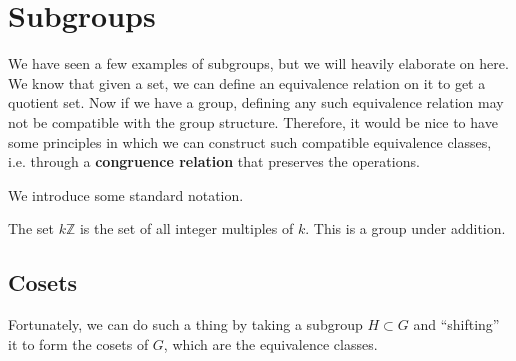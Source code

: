 \section{Subgroups} 

  We have seen a few examples of subgroups, but we will heavily elaborate on here. We know that given a set, we can define an equivalence relation on it to get a quotient set. Now if we have a group, defining any such equivalence relation may not be compatible with the group structure. Therefore, it would be nice to have some principles in which we can construct such compatible equivalence classes, i.e. through a \textbf{congruence relation} that preserves the operations. 

  We introduce some standard notation. 

  \begin{definition}
    The set $k \mathbb{Z}$ is the set of all integer multiples of $k$. This is a group under addition. 
  \end{definition}

\subsection{Cosets}

  Fortunately, we can do such a thing by taking a subgroup $H \subset G$ and ``shifting'' it to form the cosets of $G$, which are the equivalence classes. 
  
